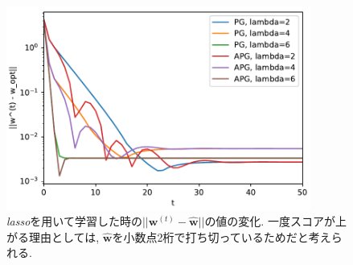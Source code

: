 \documentclass[a4paper,10pt]{jsarticle}
\begin{document}
\begin{figure}[htbp]
 \begin{center}
   \includegraphics[width=10cm]{figs/p2_lasso_dist.pdf}
 \end{center}
 \caption{\textit{lasso}を用いて学習した時の$||\bm{w}^{(t)} - \hat{\bm{w}}||$の値の変化.
 一度スコアが上がる理由としては,  $\hat{\bm{w}}$を小数点2桁で打ち切っているためだと考えられる.}
 \label{img:lasso-error}
\end{figure}
\end{document}
